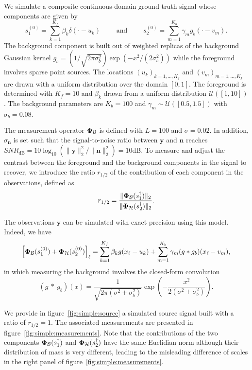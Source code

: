\documentclass[12pt]{article}
\begin{document}
            We simulate a composite continuous-domain ground truth signal whose components are given by 
            $$s_1^{(0)} = \sum_{k=1}^{K_f} \beta_ k \delta(\cdot - u_k) \qquad\text{ and }\qquad s_2^{(0)} = \sum_{m=1}^{K_b} \gamma_m g_b(\cdot - v_m).
            $$
            The background component is built out of weighted replicas of the background Gaussian kernel $g_b = (1/\sqrt{2\pi\sigma_b^2}) \exp{(-x^2/(2 \sigma_b^2))}$ while the foreground involves sparse point sources. The locations $(u_k)_{k=1, \dots, K_f}$ and $(v_m)_{m=1, \dots, K_f}$ are drawn with a uniform distribution over the domain $[0, 1]$. The foreground is determined with $K_f = 10$ and $\beta_k$ drawn from a uniform distribution $\mathcal{U}([1, 10])$. The background parameters are $K_b = 100$ and $\gamma_m \sim \mathcal{U}([0.5, 1.5])$ with $\sigma_b = 0.08$.
            
            The measurement operator $\bm{\Phi}_\mathcal{B}$ is defined with $L=100$ and $\sigma=0.02$. In addition, $\sigma_{\bm{n}}$ is set such that the signal-to-noise ratio between $\bm{y}$ and $\bm{n}$ reaches $SNR_\mathrm{dB} = 10 \log_{10}\left({\lVert \bm{y} \rVert_2^2}/{\lVert \bm{n} \rVert_2^2}\right) = 10$dB. To measure and adjust the contrast between the foreground and the background components in the signal to recover, we introduce the ratio $r_{1/2}$ of the contribution of each component in the observations, defined as
            \begin{equation}
                r_{1/2} = \frac{\lVert \bm{\Phi}_\mathcal{B} (s_1^\dagger) \rVert_2 }{\lVert \bm{\Phi}_\mathcal{H} (s_2^\dagger) \rVert_2 }.
            \end{equation}
    
            The observations $\bm{y}$ can be simulated with exact precision using this model. Indeed, we have
            $$
            \left[\bm{\Phi}_\mathcal{B}(s_1^{(0)}) + \bm{\Phi}_\mathcal{H}(s_2^{(0)})\right]_\ell = \sum_{k=1}^{K_f} \beta_k g(x_\ell - u_k) + \sum_{m=1}^{K_b} \gamma_m (g * g_b)(x_\ell - v_m),
            $$
            in which measuring the background involves the closed-form convolution
            $$
            (g\ *\ g_b)(x) = \frac{1}{\sqrt{2 \pi(\sigma^2 + \sigma_b^2)}} \exp{\left(-\frac{x^2}{2 (\sigma^2 + \sigma_b^2)}\right)}.
            $$
            
            We provide in figure~\ref{fig:simple:source} a simulated source signal built with a ratio of $r_{1/2} = 1$. 
            The associated measurements are presented in figure~\ref{fig:simple:measurements}. Note that the contributions of the two components $\bm{\Phi}_\mathcal{B}(s_1^\dagger)$ and $\bm{\Phi}_\mathcal{H}(s_2^\dagger)$ have the same Euclidian norm although their distribution of mass is very different, leading to the misleading difference of scales in the right panel of figure~\ref{fig:simple:measurements}. %
    
\end{document}
